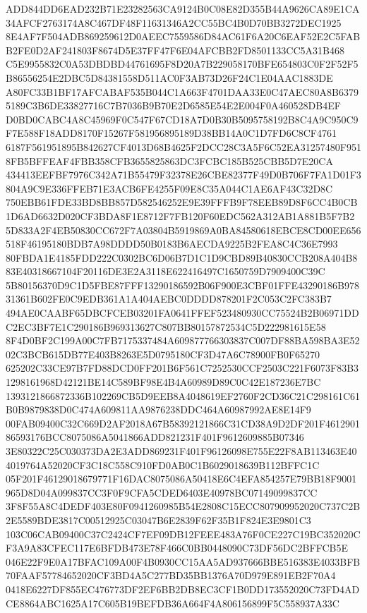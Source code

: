 \documentclass[UTF8,fontset=fandol,zihao=-4,a4paper]{ctexart}
\begin{document}
{{ADD844DD6EAD232B71E23282563CA9124B0C08E82D355B44A9626CA89E1CA34AFCF2763174A8C467DF48F11631346A2CC55BC4B0D70BB3272DEC1925
8E4AF7F504ADB869259612D0AEEC7559586D84AC61F6A20C6EAF52E2C5FABB2FE0D2AF241803F8674D5E37FF47F6E04AFCBB2FD8501133CC5A31B468
C5E9955832C0A53DBDBD44761695F8D20A7B229058170BFE654803C0F2F52F5B86556254E2DBC5D84381558D511AC0F3AB73D26F24C1E04AAC1883DE
A80FC33B1BF17AFCABAF535B044C1A663F4701DAA33E0C47AEC80A8B63795189C3B6DE33827716C7B7036B9B70E2D6585E54E2E004F0A460528DB4EF
D0BD0CABC4A8C45969F0C547F67CD18A7D0B30B5095758192B8C4A9C950C9F7E588F18ADD8170F15267F581956895189D38BB14A0C1D7FD6C8CF4761
6187F561951895B842627CF4013D68B4625F2DCC28C3A5F6C52EA31257480F9518FB5BFFEAF4FBB358CFB3655825863DC3FCBC185B525CBB5D7E20CA
434413EEFBF7976C342A71B55479F32378E26CBE82377F49D0B706F7FA1D01F3804A9C9E336FFEB71E3ACB6FE4255F09E8C35A044C1AE6AF43C32D8C
750EBB61FDE33BD8BB857D582546252E9E39FFFB9F78EEB89D8F6CC4B0CB1D6AD6632D020CF3BDA8F1E8712F7FB120F60EDC562A312AB1A881B5F7B2
5D833A2F4EB50830CC672F7A03804B5919869A0BA84580618EBCE8CD00EE656518F46195180BDB7A98DDDD50B0183B6AECDA9225B2FEA8C4C36E7993
80FBDA1E4185FDD222C0302BC6D06B7D1C1D9CBD89B40830CCB208A404B883E40318667104F20116DE3E2A3118E622416497C1650759D7909400C39C
5B80156370D9C1D5FBE87FFF13290186592B06F900E3CBF01FFE43290186B97831361B602FE0C9EDB361A1A404AEBC0DDDD878201F2C053C2FC383B7
494AE0CAABF65DBCFCEB03201FA0641FFEF523480930CC75524B2B06971DDC2EC3BF7E1C290186B969313627C807BB80157872534C5D222981615E58
8F4D0BF2C199A00C7FB7175337484A609877766303837C007DF88BA598BA3E5202C3BCB615DB77E403B8263E5D0795180CF3D47A6C78900FB0F65270
625202C33CE97B7FD88DCD0FF201B6F561C7252530CCF2503C221F6073F83B31298161968D42121BE14C589BF98E4B4A60989D89C0C42E187236E7BC
1393121866872336B102269CB5D9EEB8A4048619EF2760F2CD36C21C298161C61B0B9879838D0C474A609811AA9876238DDC464A60987992AE8E14F9
00FAB09400C32C669D2AF2018A67B58392121866C31CD38A9D2DF201F461290186593176BCC8075086A5041866ADD821231F401F9612609885B07346
3E80322C25C030373DA2E3ADD869231F401F96126098E755E22F8AB113463E404019764A52020CF3C18C558C910FD0AB0C1B6029018639B112BFFC1C
05F201F46129018679771F16DAC8075086A50418E6C4EFA854257E79BB18F9001965D8D04A099837CC3F0F9CFA5CDED6403E40978BC07149099837CC
3F8F55A8C4DEDF403E80F0941260985B54E2808C15ECC807909952020C737C2B2E5589BDE3817C00512925C03047B6E2839F62F35B1F824E3E9801C3
103C06CAB09400C37C2424CF7EF09DB12FEEE483A76F0CE227C19BC352020CF3A9A83CFEC117E6BFDB473E78F466C0BB0448090C73DF56DC2BFFCB5E
046E22F9E0A17BFAC109A00F4B0930CC15AA5AD937666BBE516383E4033BFB70FAAF57784652020CF3BD4A5C277BD35BB1376A70D979E891EB2F70A4
0418E6227DF855EC476773DF2EF6BB2DB8EC3CF1B0DD173552020C73FD4ADCE8864ABC1625A17C605B19BEFDB36A664F4A806156899F5C558937A33C
}}
\end{document}
